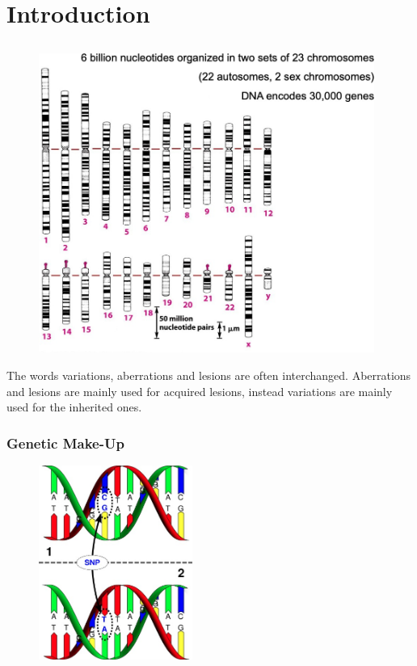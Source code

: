 \graphicspath{{chapters/ThebasicsImages/}}


\chapter{Introduction}
\section{}

\begin{figure}[H]
  \includegraphics[width=4.32507in,height=3.86281in]{image1.jpeg}
  \centering
  \caption{}
\end{figure}


The words variations, aberrations and lesions are often interchanged.
Aberrations and lesions are mainly used for acquired lesions, instead variations
are mainly used for the inherited ones.

\hypertarget{genetic-make-up}{%
\subsection{Genetic Make-Up}\label{genetic-make-up}}

\begin{figure}[H]
  \includegraphics[width=1.97816in,height=2.50248in]{image2.jpeg}
  \centering
  \caption{}
  \label{fig: SNP}
\end{figure}


